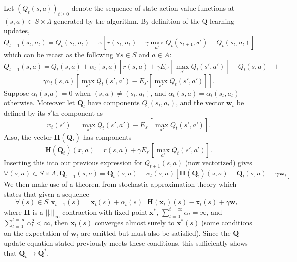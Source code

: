 \documentclass{article} %
\begin{document}
Let $(Q_t(s,a))_{t\geq 0}$ denote the sequence of state-action value functions at $(s,a) \in S \times A$ generated by the algorithm.  By definition of the Q-learning updates,
$$
Q_{t+1}(s_t,a_t) = Q_t(s_t,a_t) + \alpha[r(s_t,a_t) + \gamma \max_{a'}Q_t(s_{t+1},a') - Q_t(s_t,a_t)]
$$
which can be recast as the following $\forall s \in S$ and $a \in A$:
$$
Q_{t+1}(s,a) = Q_t(s,a) + \alpha_t(s,a)[r(s,a) + \gamma E_{s'}[\max_{a'}Q_t(s',a')] - Q_t(s,a)] +
$$
$$
\gamma\alpha_t(s,a)[\max_{a'}Q_t(s',a') - E_{s'}[\max_{a'}Q_t(s',a')] ].
$$
Suppose $\alpha_t(s,a) = 0$ when $(s,a) \neq (s_t,a_t)$, and $\alpha_t(s,a) = \alpha_t(s_t,a_t)$ otherwise. Moreover let $\textbf{Q}_t$ have components $Q_t(s_t,a_t)$, and the vector $\textbf{w}_t$ be defined by its $s'$th component as
$$
w_t(s') = \max_{a'}Q_t(s',a') - E_{s'} [\max_{a'}Q_t(s',a') ].
$$
Also, the vector $\textbf{H}(\textbf{Q}_t)$ has components
$$
\textbf{H}(\textbf{Q}_t)(x,a) = r(s,a) + \gamma E_{s'}[\max_{a'}Q_t(s',a') ].
$$
Inserting this into our previous expression for $Q_{t+1}(s,a)$ (now vectorized) gives
$$
\forall (s,a) \in S \times A, \textbf{Q}_{t+1}(s,a) = \textbf{Q}_t(s,a) + \alpha_t(s,a)[\textbf{H}(\textbf{Q}_t)(s,a) - \textbf{Q}_t(s,a) + \gamma\textbf{w}_t].
$$
We then make use of a theorem from stochastic approximation theory \cite{mohri} which states that given a sequence
$$
\forall (s) \in S , \textbf{x}_{t+1}(s) = \textbf{x}_t(s) + \alpha_t(s)[\textbf{H}(\textbf{x}_t)(s) - \textbf{x}_t(s) + \gamma\textbf{w}_t]
$$
where $\textbf{H}$ is a $||.||_{\infty}$-contraction with fixed point $\textbf{x}^*$, $\sum_{t=0}^{t=\infty}\alpha_t = \infty$, and $\sum_{t=0}^{t=\infty}\alpha_t^2 < \infty$, then $\textbf{x}_t(s)$ converges almost surely to $\textbf{x}^*(s)$ (some conditions on the expectation of $\textbf{w}_t$ are omitted but must also be satisfied).  Since the $\textbf{Q}$ update equation stated previously meets these conditions, this sufficiently shows that $\textbf{Q}_t \rightarrow \textbf{Q}^*$.
\end{document}
